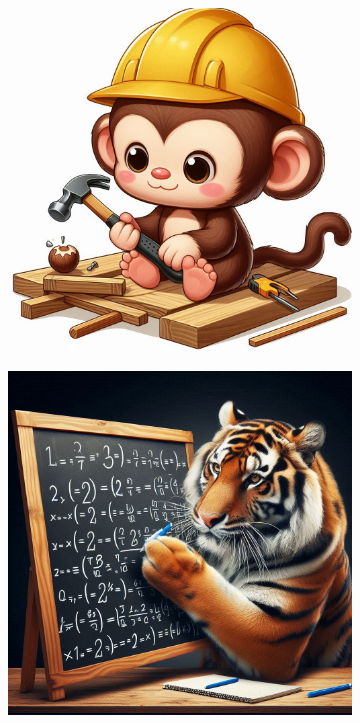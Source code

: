 \begin{figure}[H] %
    \centering
    \begin{subfigure}[b]{0.3\textwidth}
        \centering
        \includegraphics[width = \textwidth]{imagenes/test1.jpeg}
        \caption{}
        \label{subfig:test1}
    \end{subfigure}
    \hfill
    \begin{subfigure}[b]{0.3\textwidth}
        \centering
        \includegraphics[width = \textwidth]{imagenes/test2.jpeg}

\end{subfigure}
\end{figure}
